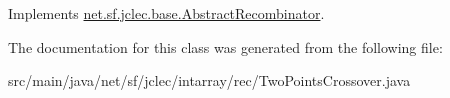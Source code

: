 Implements \hyperlink{classnet_1_1sf_1_1jclec_1_1base_1_1_abstract_recombinator_a1f94790294ad036473b5e1ffa563597e}{net.\-sf.\-jclec.\-base.\-Abstract\-Recombinator}.



The documentation for this class was generated from the following file\-:\begin{DoxyCompactItemize}
\item 
src/main/java/net/sf/jclec/intarray/rec/Two\-Points\-Crossover.\-java\end{DoxyCompactItemize}
